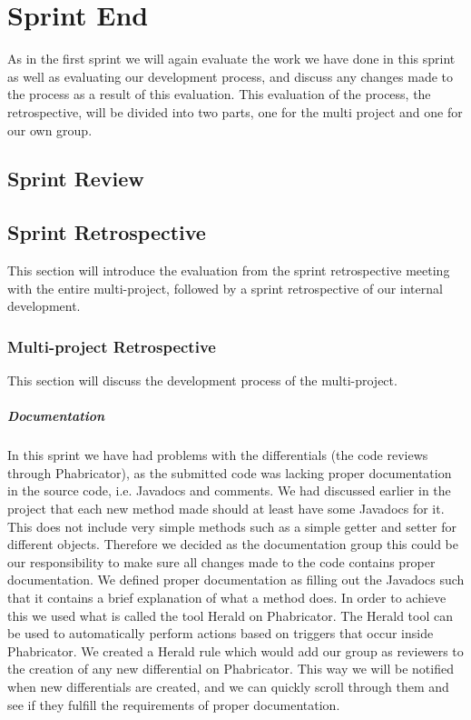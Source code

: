 \chapter{Sprint End}
As in the first sprint we will again evaluate the work we have done in this sprint as well as evaluating our development process, and discuss any changes made to the process as a result of this evaluation.
This evaluation of the process, the retrospective, will be divided into two parts, one for the multi project and one for our own group.
\section{Sprint Review}

\section{Sprint Retrospective}
This section will introduce the evaluation from the sprint retrospective meeting with the entire multi-project, followed by a sprint retrospective of our internal development.
\subsection*{Multi-project Retrospective}
This section will discuss the development process of the multi-project.
\paragraph{Documentation}
In this sprint we have had problems with the differentials (the code reviews through Phabricator), as the submitted code was lacking proper documentation in the source code, i.e. Javadocs and comments. 
We had discussed earlier in the project that each new method made should at least have some Javadocs for it.
This does not include very simple methods such as a simple getter and setter for different objects.
Therefore we decided as the documentation group this could be our responsibility to make sure all changes made to the code contains proper documentation.
We defined proper documentation as filling out the Javadocs such that it contains a brief explanation of what a method does.
In order to achieve this we used what is called the tool Herald on Phabricator.
The Herald tool can be used to automatically perform actions based on triggers that occur inside Phabricator.
We created a Herald rule which would add our group as reviewers to the creation of any new differential on Phabricator.
This way we will be notified when new differentials are created, and we can quickly scroll through them and see if they fulfill the requirements of proper documentation.

